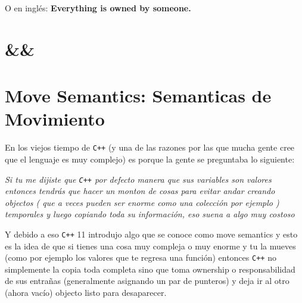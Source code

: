 \documentclass[12pt, fleqn]{report}                             %
\theoremstyle{break}                                            %
\newcommand{\textCode}[1]  { \texttt{#1} }                      %
\newcommand \Cpp  {\textCode{C++} }                               %
\begin{document}
            O en inglés:
            \textbf{
                Everything is owned by someone.
            }

            \cite{ModernCppWhatYouNeedToKnow}

        \clearpage
        \section{\&\&}   

        \clearpage
        \section{Move Semantics: Semanticas de Movimiento}     
        
            En los viejos tiempo de \Cpp (y una de las razones por las que mucha gente cree que 
            el lenguaje es muy complejo) es porque la gente se preguntaba lo siguiente:

            \textit{Si tu me dijiste que \Cpp por defecto manera que sus variables son valores
            entonces tendrás que hacer un monton de cosas para evitar andar creando objectos (
                que a veces pueden ser enorme como una colección por ejemplo
            ) temporales y luego copiando toda su información, eso suena a algo muy costoso}

            Y debido a eso \Cpp 11 introdujo algo que se conoce como move semantics
            y esto es la idea de que si tienes una cosa muy compleja o muy enorme y tu la mueves
            (como por ejemplo los valores que te regresa una función) entonces \Cpp no simplemente 
            la copia toda completa sino que toma ownership o responsabilidad de sus entrañas
            (generalmente asignando un par de punteros) y deja ir al otro (ahora vacío) objecto listo para
            desaparecer.

            \cite{ModernCppWhatYouNeedToKnow}

        \clearpage
\end{document}
